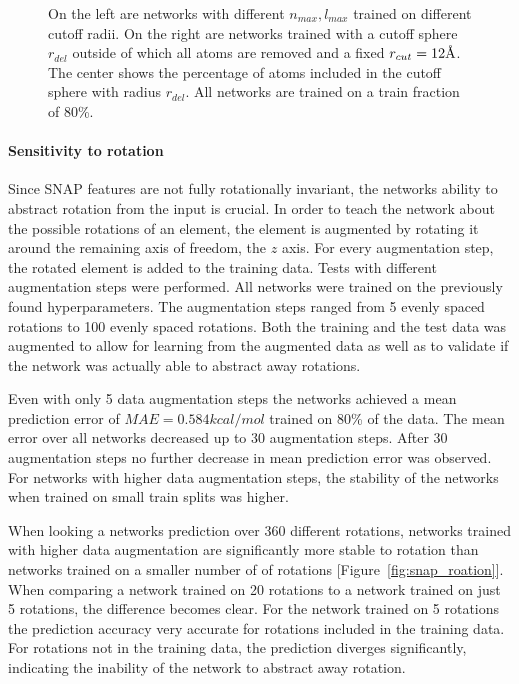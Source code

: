 \begin{figure}[!htb]
  \endminipage\hfill
  \caption[Comparison of SNAP cutoff radii]{
  On the left are networks with different $n_{max}, l_{max}$ trained on different cutoff radii.
  On the right are networks trained with a cutoff sphere $r_{del}$ outside of which all atoms are removed and a fixed $r_{cut} = 12 \AA$.
  The center shows the percentage of atoms included in the cutoff sphere with radius $r_{del}$.
  All networks are trained on a train fraction of 80\%.
 }
  \label{fig:snap_hyperparameter}
\end{figure}


\paragraph{Sensitivity to rotation}
Since SNAP features are not fully rotationally invariant, the networks ability to abstract rotation from the input is crucial.
In order to teach the network about the possible rotations of an element, 
the element is augmented by rotating it around the remaining axis of freedom, the $z$ axis.
For every augmentation step, the rotated element is added to the training data.
Tests with different augmentation steps were performed.
All networks were trained on the previously found hyperparameters.
The augmentation steps ranged from 5 evenly spaced rotations to 100 evenly spaced rotations.
Both the training and the test data was augmented to allow for learning from the augmented data
as well as to validate if the network was actually able to abstract away rotations.

Even with only 5 data augmentation steps the networks achieved a mean prediction error of $MAE = 0.584 kcal/mol$ trained on 80\% of the data.
The mean error over all networks decreased up to 30 augmentation steps.
After 30 augmentation steps no further decrease in mean prediction error was observed.
For networks with higher data augmentation steps, the stability of the networks when trained on small train splits was higher.

When looking a networks prediction over 360 different rotations, networks trained with higher data augmentation 
are significantly more stable to rotation than networks trained on a smaller number of of rotations [Figure~\ref{fig:snap_roation}].
When comparing a network trained on 20 rotations to a network trained on just 5 rotations,
the difference becomes clear.
For the network trained on 5 rotations the prediction accuracy very accurate for rotations included in the training data.
For rotations not in the training data, the prediction diverges significantly, indicating the inability of the network to abstract away rotation.

